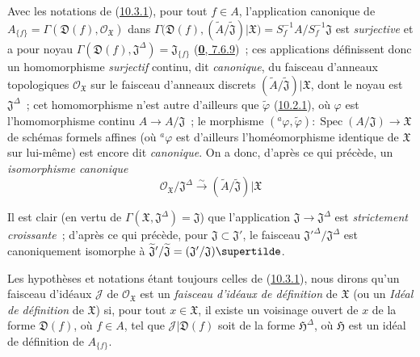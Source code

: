 \begin{env}[10.3.2]
\label{I.10.3.2-fr}
Avec les notations de (\hyperref[I.10.3.1-fr]{10.3.1}), pour tout $f\in A$,
l'application canonique de
$A_{\{f\}}=\Gamma(\mathfrak{D}(f),\mathscr{O}_{\mathfrak{X}})$ dans
$\Gamma\bigl(\mathfrak{D}(f),
(\widetilde{A}/\widetilde{\mathfrak{J}})|\mathfrak{X}\bigr)
=S_f^{-1}A/S_f^{-1}\mathfrak{J}$
est \emph{surjective} et a pour noyau
$\Gamma(\mathfrak{D}(f),\mathfrak{J}^\Delta)=\mathfrak{J}_{\{f\}}$
(\hyperref[0.7.6.9-fr]{\textbf{0}, 7.6.9})~; ces applications définissent donc un
homomorphisme \emph{surjectif} continu, dit \emph{canonique}, du faisceau
d'anneaux topologiques $\mathscr{O}_{\mathfrak{X}}$ sur le faisceau
d'anneaux discrets
$(\widetilde{A}/\widetilde{\mathfrak{J}})|\mathfrak{X}$, dont le noyau est
$\mathfrak{J}^\Delta$~; cet homomorphisme n'est autre d'ailleurs que
$\widetilde{\varphi}$ (\hyperref[I.10.2.1-fr]{10.2.1}), où $\varphi$ est
l'homomorphisme continu $A\to A/\mathfrak{J}$~; le morphisme
$({}^a\varphi,\widetilde{\varphi}):
\operatorname{Spec}(A/\mathfrak{J})\to\mathfrak{X}$ de schémas formels
affines (où ${}^a\varphi$ est d'ailleurs l'homéomorphisme identique de
$\mathfrak{X}$ sur lui-même) est encore dit \emph{canonique}. On a donc,
d'après ce qui précède, un \emph{isomorphisme canonique}
\[
  \mathscr{O}_{\mathfrak{X}}/\mathfrak{J}^\Delta
  \xrightarrow{\sim}
  (\widetilde{A}/\widetilde{\mathfrak{J}})|\mathfrak{X}
  \tag{10.3.2.1}\label{I.10.3.2.1-fr}
\]

Il est clair (en vertu de
$\Gamma(\mathfrak{X},\mathfrak{J}^\Delta)=\mathfrak{J}$) que
l'application $\mathfrak{J}\to\mathfrak{J}^\Delta$ est
\emph{strictement croissante}~; d'après ce qui précède, pour
$\mathfrak{J}\subset\mathfrak{J}'$, le faisceau
${\mathfrak{J}'}^\Delta/\mathfrak{J}^\Delta$ est canoniquement isomorphe à
$\widetilde{\mathfrak{J}}'/\widetilde{\mathfrak{J}}
=(\mathfrak{J}'/\mathfrak{J})\supertilde$.
\end{env}

\begin{env}[10.3.3]
\label{I.10.3.3-fr}
Les hypothèses et notations étant toujours celles de
(\hyperref[I.10.3.1-fr]{10.3.1}), nous dirons qu'un faisceau d'idéaux
$\mathscr{J}$ de $\mathscr{O}_{\mathfrak{X}}$ est un
\emph{faisceau d'idéaux de définition} de $\mathfrak{X}$ (ou un
\emph{Idéal de définition} de $\mathfrak{X}$) si, pour tout
$x\in\mathfrak{X}$, il existe un voisinage ouvert de $x$ de la forme
$\mathfrak{D}(f)$, où $f\in A$, tel que
$\mathscr{J}|\mathfrak{D}(f)$ soit de la forme $\mathfrak{H}^\Delta$, où
$\mathfrak{H}$ est un idéal de définition de $A_{\{f\}}$.
\end{env}

